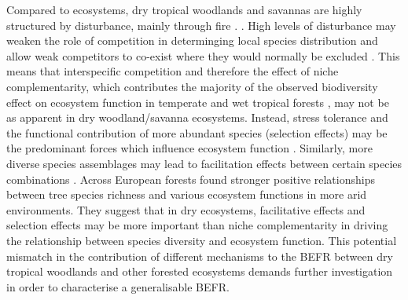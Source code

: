 \documentclass[11pt,a4paper]{article}
\begin{document}
Compared to  ecosystems, dry tropical woodlands and savannas are highly structured by disturbance, mainly through fire  \citep{Sankaran2008, Levick2009}. . High levels of disturbance may weaken the role of competition in determinging local species distribution and allow weak competitors to co-exist where they would normally be excluded \citep{Grime1979, Grace1990}. This means that interspecific competition and therefore the effect of niche complementarity, which contributes the majority of the observed biodiversity effect on ecosystem function in temperate and wet tropical forests \citep{Wright2017, Poorter2015, Sande2017a}, may not be as apparent in dry woodland/savanna ecosystems. Instead, stress tolerance and the functional contribution of more abundant species (selection effects) may be the predominant forces which influence ecosystem function \citep{Lasky2014, Tobner2016}. Similarly, more diverse species assemblages may lead to facilitation effects between certain species combinations . Across European forests \citet{Ratcliffe2017} found stronger positive relationships between tree species richness and various ecosystem functions in more arid environments. They suggest that in dry ecosystems, facilitative effects and selection effects may be more important than niche complementarity in driving the relationship between species diversity and ecosystem function. This potential mismatch in the contribution of different mechanisms to the BEFR between dry tropical woodlands and other forested ecosystems demands further investigation in order to characterise a generalisable BEFR.
\end{document}
